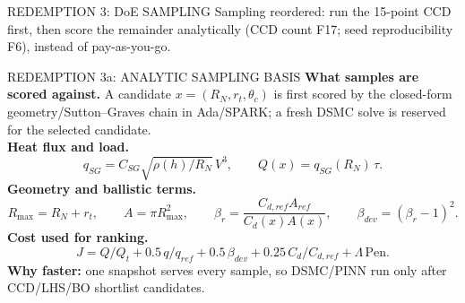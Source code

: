 \documentclass[aspectratio=169,11pt]{beamer}
\begin{document}
\begin{frame}{REDEMPTION 3: DoE SAMPLING}
  Sampling reordered: run the 15-point CCD first, then score the remainder analytically
  (CCD count F17; seed reproducibility F6), instead of pay-as-you-go.
\end{frame}
\begin{frame}{REDEMPTION 3a: ANALYTIC SAMPLING BASIS}
  \small
  \textbf{What samples are scored against.} A candidate
  $x=(R_N,r_t,\theta_c)$ is first scored by the closed-form geometry/Sutton--Graves
  chain in Ada/SPARK; a fresh DSMC solve is reserved for the selected candidate.\\
  \textbf{Heat flux and load.}
  \[
    q_{SG}=C_{SG}\sqrt{\rho(h)/R_N}\,V^3,
    \qquad
    Q(x)=q_{SG}(R_N)\,\tau .
  \]
  \textbf{Geometry and ballistic terms.}
  \[
    R_{\max}=R_N+r_t,\qquad
    A=\pi R_{\max}^2,\qquad
    \beta_r=\frac{C_{d,ref}A_{ref}}{C_d(x)A(x)},\qquad
    \beta_{dev}=(\beta_r-1)^2 .
  \]
  \textbf{Cost used for ranking.}
  \[
    J=Q/Q_t+0.5\,q/q_{ref}+0.5\,\beta_{dev}
      +0.25\,C_d/C_{d,ref}+\Lambda\,\mathrm{Pen}.
  \]
  \textbf{Why faster:} one snapshot serves every sample, so DSMC/PINN run only
  after CCD/LHS/BO shortlist candidates.
\end{frame}
\end{document}
